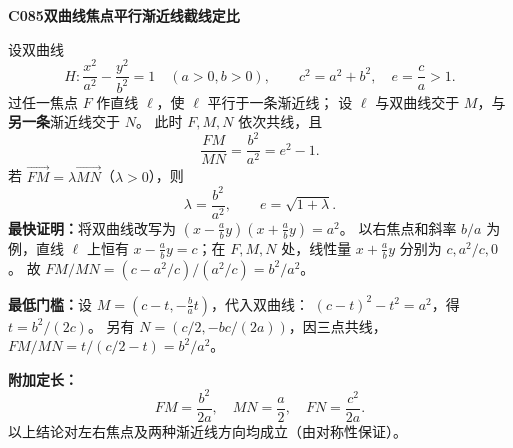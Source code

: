 \textbf{C085\quad 双曲线焦点平行渐近线截线定比}

设双曲线
\[
H:\frac{x^2}{a^2}-\frac{y^2}{b^2}=1\quad(a>0,b>0),
\qquad c^2=a^2+b^2,\quad e=\frac ca>1.
\]
过任一焦点 $F$ 作直线 $\ell$，使 $\ell$ 平行于一条渐近线；
设 $\ell$ 与双曲线交于 $M$，与\textbf{另一条}渐近线交于 $N$。
此时 $F,M,N$ 依次共线，且
\[
\boxed{\frac{FM}{MN}=\frac{b^2}{a^2}=e^2-1}.
\]
若 $\overrightarrow{FM}=\lambda\overrightarrow{MN}$（$\lambda>0$），则
\[
\boxed{\lambda=\frac{b^2}{a^2}},\qquad
\boxed{e=\sqrt{1+\lambda}}.
\]
\textbf{最快证明：}将双曲线改写为
$(x-\tfrac ab y)(x+\tfrac ab y)=a^2$。
以右焦点和斜率 $b/a$ 为例，直线 $\ell$ 上恒有
$x-\tfrac ab y=c$；在 $F,M,N$ 处，线性量
$x+\tfrac ab y$ 分别为 $c,a^2/c,0$。
故 $FM/MN=(c-a^2/c)/(a^2/c)=b^2/a^2$。

\textbf{最低门槛：}设 $M=(c-t,-\tfrac ba t)$，代入双曲线：
$(c-t)^2-t^2=a^2$，得 $t=b^2/(2c)$。
另有 $N=(c/2,-bc/(2a))$，因三点共线，
$FM/MN=t/(c/2-t)=b^2/a^2$。

\textbf{附加定长：}
\[
\boxed{FM=\frac{b^2}{2a},\quad MN=\frac a2,\quad FN=\frac{c^2}{2a}}.
\]
以上结论对左右焦点及两种渐近线方向均成立（由对称性保证）。
